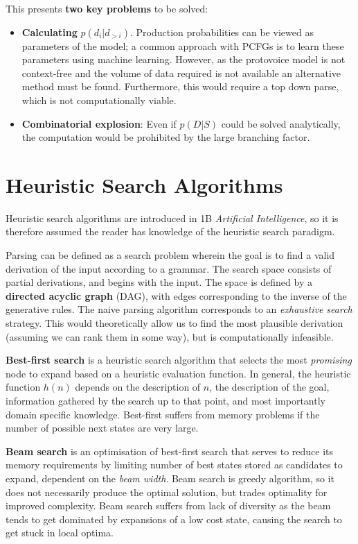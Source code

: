\documentclass[12pt,a4paper,twoside,openright]{report} \usepackage[pdfborder={0 0 0}]{hyperref}    %
\theoremstyle{definition} \newtheorem{definition}{Definition}[section]
\begin{document}
This presents \textbf{two key problems} to be solved: \begin{itemize} \item \textbf{Calculating} $p(d_i|d_{>i})$.
  Production probabilities can be viewed as parameters of the model; a common approach with PCFGs is to learn these
  parameters using machine learning. However, as the protovoice model is not context-free and the volume of data
  required is not available an alternative method must be found. Furthermore, this would require a top down parse, which
  is not computationally viable. \item \textbf{Combinatorial explosion}: Even if $p(D|S)$ could be solved analytically,
  the computation would be prohibited by the large branching factor.
\end{itemize}

\section{Heuristic Search Algorithms}

Heuristic search algorithms are introduced in 1B \textit{Artificial Intelligence}, so it is therefore assumed the reader
has knowledge of the heuristic search paradigm.

Parsing can be defined as a search problem wherein the goal is to find a valid derivation of the input according to
a grammar. The search space consists of partial derivations, and begins with the input. The space is defined by
a \textbf{directed acyclic graph} (DAG), with edges corresponding to the inverse of the generative rules. The naive
parsing algorithm corresponds to an \textit{exhaustive search} strategy. This would theoretically allow us to find the
most plausible derivation (assuming we can rank them in some way), but is computationally infeasible.

\textbf{Best-first search} is a heuristic search algorithm that selects the most \textit{promising} node to expand based
on a heuristic evaluation function. In general, the heuristic function $h(n)$ depends on  the description of $n$, the
description of the goal, information gathered by the search up to that point, and most importantly domain specific
knowledge\cite{pearlHeuristicsIntelligentSearch1984}. Best-first suffers from memory problems if the number of possible
next states are very large.

\textbf{Beam search} is an optimisation of best-first search that serves to reduce its memory requirements by limiting
number of best states stored as candidates to expand, dependent on the \textit{beam width}. Beam search is greedy
algorithm, so it does not necessarily produce the optimal solution, but trades optimality for improved complexity. Beam
search suffers from lack of diversity as the beam tends to get dominated by expansions of a low cost state, causing the
search to get stuck in local optima. \cite{}
\end{document}
